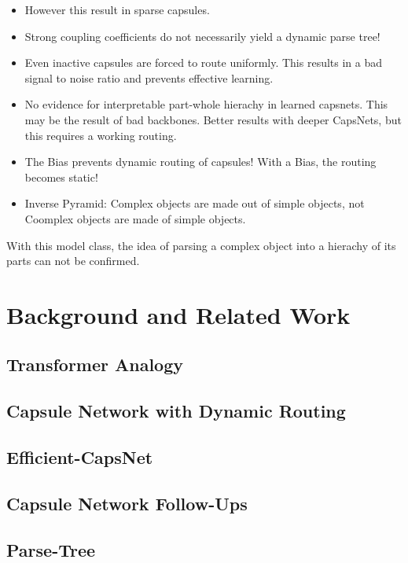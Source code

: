 \documentclass{article}
\begin{document}
\begin{itemize}
	\item However this result in sparse capsules.
	\item Strong coupling coefficients do not necessarily yield a dynamic parse tree!
	\item Even inactive capsules are forced to route uniformly. This results in a bad signal to noise ratio and prevents effective learning.
	\item No evidence for interpretable part-whole hierachy in learned capsnets. This may be the result of bad backbones. Better results with deeper CapsNets, but this requires a working routing.
	\item The Bias prevents dynamic routing of capsules! With a Bias, the routing becomes static!
	\item Inverse Pyramid: Complex objects are made out of simple objects, not Coomplex objects are made of simple objects.
\end{itemize}

With this model class, the idea of parsing a complex object into a hierachy of its parts can not be confirmed.

\section{Background and Related Work}
\subsection*{Transformer Analogy}
\subsection*{Capsule Network with Dynamic Routing}
\subsection*{Efficient-CapsNet}
\subsection*{Capsule Network Follow-Ups}

\subsection*{Parse-Tree}
\end{document}
